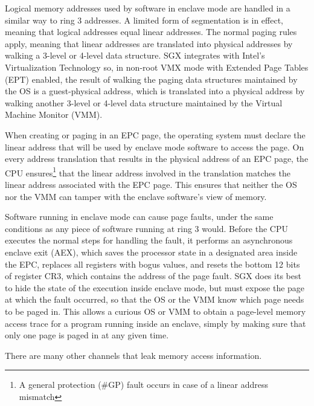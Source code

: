 Logical memory addresses used by software in enclave mode are handled in a
similar way to ring 3 addresses. A limited form of segmentation is in effect,
meaning that logical addresses equal linear addresses. The normal paging rules
apply, meaning that linear addresses are translated into physical addresses
by walking a 3-level or 4-level data structure. SGX integrates with Intel's
Virtualization Technology \cite{uhlig2005intel} so, in non-root VMX mode with
Extended Page Tables (EPT) enabled, the result of walking the paging data
structures maintained by the OS is a guest-physical address, which is
translated into a physical address by walking another 3-level or 4-level
data structure maintained by the Virtual Machine Monitor (VMM).

When creating or paging in an EPC page, the operating system must declare the
linear address that will be used by enclave mode software to access the page.
On every address translation that results in the physical address of an EPC
page, the CPU ensures\footnote{A general protection (\#GP) fault occurs in case
of a linear address mismatch} that the linear address involved in the
translation matches the linear address associated with the EPC page. This
ensures that neither the OS nor the VMM can tamper with the enclave software's
view of memory.

Software running in enclave mode can cause page faults, under the same
conditions as any piece of software running at ring 3 would. Before the CPU
executes the normal steps for handling the fault, it performs an asynchronous
enclave exit (AEX), which saves the processor state in a designated area inside
the EPC, replaces all registers with bogus values, and resets the bottom 12
bits of register CR3, which contains the address of the page fault. SGX does
its best to hide the state of the execution inside enclave mode, but must
expose the page at which the fault occurred, so that the OS or the VMM know
which page needs to be paged in. This allows a curious OS or VMM to obtain a
page-level memory access trace for a program running inside an enclave, simply
by making sure that only one page is paged in at any given time.

There are many other channels that leak memory access information.

